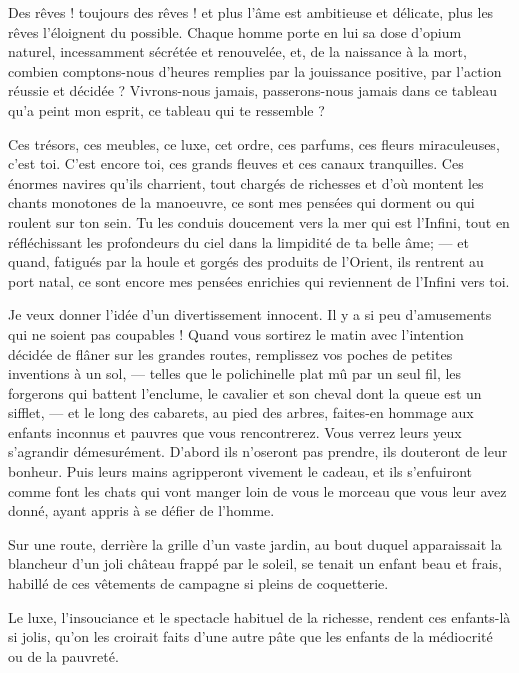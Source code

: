 Des rêves ! toujours des rêves ! et plus l’âme est
ambitieuse et délicate, plus les rêves l’éloignent du
possible. Chaque homme porte en lui sa dose d’opium
naturel, incessamment sécrétée et renouvelée, et, de la naissance à la
mort, combien comptons{}-nous d’heures remplies par la
jouissance positive, par l’action réussie et décidée ?
Vivrons{}-nous jamais, passerons{}-nous jamais dans ce tableau
qu’a peint mon esprit, ce tableau qui te ressemble ?

Ces trésors, ces meubles, ce luxe, cet ordre, ces parfums, ces fleurs
miraculeuses, c’est toi. C’est encore
toi, ces grands fleuves et ces canaux tranquilles. Ces énormes navires
qu’ils charrient, tout chargés de richesses et
d’où montent les chants monotones de la manoeuvre, ce
sont mes pensées qui dorment ou qui roulent sur ton sein. Tu les
conduis doucement vers la mer qui est l’Infini, tout
en réfléchissant les profondeurs du ciel dans la limpidité de ta belle
âme; --- et quand, fatigués par la houle et gorgés des produits de
l’Orient, ils rentrent au port natal, ce sont encore
mes pensées enrichies qui reviennent de l’Infini vers
toi.


Je veux donner l’idée d’un
divertissement innocent. Il y a si peu d’amusements
qui ne soient pas coupables !
Quand vous sortirez le matin avec l’intention décidée
de flâner sur les grandes routes, remplissez vos poches de petites
inventions à un sol, --- telles que le polichinelle plat mû par un seul
fil, les forgerons qui battent l’enclume, le cavalier
et son cheval dont la queue est un sifflet, --- et le long des cabarets,
au pied des arbres, faites{}-en hommage aux enfants inconnus et pauvres
que vous rencontrerez. Vous verrez leurs yeux
s’agrandir démesurément. D’abord ils
n’oseront pas prendre, ils douteront de leur bonheur.
Puis leurs mains agripperont vivement le cadeau, et ils
s’enfuiront comme font les chats qui vont manger loin
de vous le morceau que vous leur avez donné, ayant appris à se défier
de l’homme.

Sur une route, derrière la grille d’un vaste jardin, au
bout duquel apparaissait la blancheur d’un joli
château frappé par le soleil, se tenait un enfant beau et frais,
habillé de ces vêtements de campagne si pleins de coquetterie.

Le luxe, l’insouciance et le spectacle habituel de la
richesse, rendent ces enfants{}-là si jolis, qu’on les
croirait faits d’une autre pâte que les enfants de la
médiocrité ou de la pauvreté.

